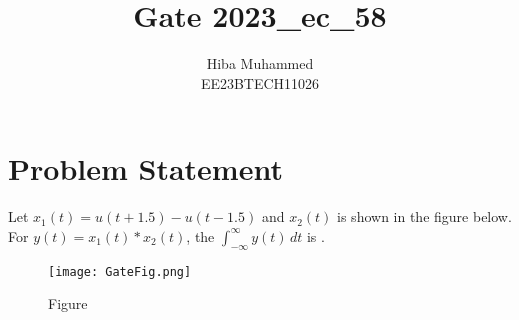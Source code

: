 \documentclass[12pt]{article}
\title{Gate 2023\_ec\_58}
\author{Hiba Muhammed \\
        EE23BTECH11026}
\begin{document}
\maketitle

\section*{Problem Statement}

Let $x_1(t) = u(t + 1.5) - u(t - 1.5)$ and $x_2(t)$ is shown in the figure below. For $y(t) = x_1(t) * x_2(t)$, the $\int_{-\infty}^{\infty} y(t) \, dt$ is \underline{\hspace{2cm}}.

\begin{figure}[htbp]
    \centering
    \texttt{[image: GateFig.png]}
    \caption{Figure}
    \label{fig:graph}
\end{figure}
\end{document}
